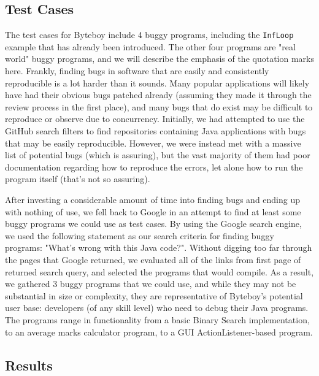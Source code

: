 \documentclass[letterpaper,twocolumn,10pt]{article}
\begin{document}
\subsection{Test Cases}

The test cases for Byteboy include 4 buggy programs, including the {\tt InfLoop} example that has already been introduced. The other four programs are "real world" buggy programs, and we will describe the emphasis of the quotation marks here. Frankly, finding bugs in software that are easily and consistently reproducible is a lot harder than it sounds. Many popular applications will likely have had their obvious bugs patched already (assuming they made it through the review process in the first place), and many bugs that do exist may be difficult to reproduce or observe due to concurrency. Initially, we had attempted to use the GitHub search filters to find repositories containing Java applications with bugs that may be easily reproducible. However, we were instead met with a massive list of potential bugs (which is assuring), but the vast majority of them had poor documentation regarding how to reproduce the errors, let alone how to run the program itself (that's not so assuring). 

After investing a considerable amount of time into finding bugs and ending up with nothing of use, we fell back to Google in an attempt to find at least some buggy programs we could use as test cases. By using the Google search engine, we used the following statement as our search criteria for finding buggy programs: "What's wrong with this Java code?". Without digging too far through the pages that Google returned, we evaluated all of the links from first page of returned search query, and selected the programs that would compile. As a result, we gathered 3 buggy programs that we could use, and while they may not be substantial in size or complexity, they are representative of Byteboy's potential user base: developers (of any skill level) who need to debug their Java programs. The programs range in functionality from a basic Binary Search implementation, to an average marks calculator program, to a GUI ActionListener-based program.

\subsection{Results}
\end{document}
